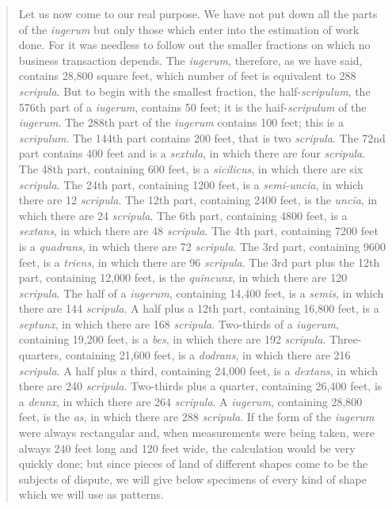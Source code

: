 \documentclass{article}
\theoremstyle{definition}
\begin{document}
\begin{quote}
Let us now come to our real purpose. We have not put down all the parts of the {\em iugerum} but only those which enter into the estimation of work done. For it was needless to
follow out the smaller fractions on which no business transaction depends. The {\em iugerum}, therefore, as we have said, contains 28,800 square feet, which number of feet is 
equivalent to 288 {\em scripula}. But to begin with the smallest fraction, the half-{\em scripulum}, the 576th part of a {\em iugerum}, contains 50 feet; it is the haif-{\em scripulum} of
the {\em iugerum}. The 288th part of the {\em iugerum} contains 100 feet; this is a {\em scripulum}. The 144th part contains 200 feet, that is two {\em scripula}. The 72nd part contains 
400 feet and is a {\em sextula}, in which there are four {\em scripula}. The 48th part, containing 600 feet, is a {\em sicilicus}, in which there
are six {\em scripula}. The 24th part, containing 1200 feet, is a {\em semi-uncia}, in which there are 12 {\em scripula}. The 12th part, containing 2400 feet, is the {\em uncia}, in
which there are 24 {\em scripula}. The 6th part, containing 4800 feet, is a {\em sextans}, in which there are 48 {\em scripula}. The 4th part, containing 7200 feet is a {\em quadrans},
in which there are 72 {\em scripula}. The 3rd part, containing 9600 feet, is a {\em triens}, in which there are 96 {\em scripula}. The 3rd part plus the 12th part, containing 12,000 feet,
is the {\em quincunx}, in which there are 120 {\em scripula}. The half of a {\em iugerum}, containing 14,400 feet, is a {\em semis}, in which there are 144 {\em scripula}. A half plus
a 12th part, containing 16,800 feet, is a {\em septunx}, in which there are 168 {\em scripula}. Two-thirds of a {\em iugerum}, containing 19,200 feet, is a {\em bes}, in which there are
192 {\em scripula}. Three-quarters, containing 21,600 feet, is a {\em dodrans}, in which there are 216 {\em scripula}. A half plus a third, containing 24,000 feet, is a {\em dextans},
in which there are 240 {\em scripula}. Two-thirds plus a quarter, containing 26,400 feet, is a {\em deunx}, in which there are 264 {\em scripula}. A {\em iugerum}, containing 28,800
feet, is the {\em as}, in which there are 288 {\em scripula}. If the form of the {\em iugerum} were always rectangular and, when measurements were being taken, were always
240 feet long and 120 feet wide, the calculation would be very quickly done; but since pieces of land of different shapes come to be the subjects of dispute, we will give below
specimens of every kind of shape which we will use as patterns.
\end{quote}
\end{document}
